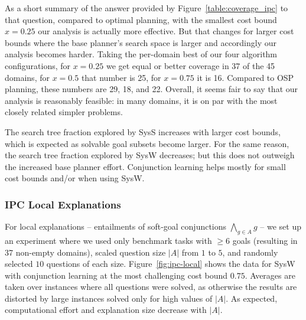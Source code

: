 As a short summary of the answer provided by
Figure~\ref{table:coverage_ipc} to that question, compared to optimal
planning, with the smallest cost bound $x=0.25$ our analysis is
actually more effective. But that changes for larger cost bounds where
the base planner's search space is larger and accordingly our analysis
becomes harder. Taking the per-domain best of our four algorithm
configurations, for $x=0.25$ we get equal or better coverage in 37 of
the 45 domains, for $x=0.5$ that number is 25, for $x=0.75$ it is
16. Compared to OSP planning, these numbers are 29, 18, and
22. Overall, it seems fair to say that our analysis is reasonably
feasible: in many domains, it is on par with the most closely related
simpler problems.

The search tree fraction explored by SysS increases with larger cost
bounds, which is expected as solvable goal subsets become larger. For
the same reason, the search tree fraction explored by SysW decreases;
but this does not outweigh the increased base planner
effort. Conjunction learning helps mostly for small cost bounds and/or
when using SysW.
%
%



\subsubsection{IPC Local Explanations}

For local explanations -- entailments of soft-goal conjunctions
$\bigwedge_{g \in A} g$ -- we set up an experiment where we used only
benchmark tasks with $\geq 6$ goals (resulting in 37 non-empty
domains), scaled question size $|A|$ from $1$ to $5$, and randomly
selected $10$ questions of each size. Figure~\ref{fig:ipc-local} shows
the data for SysW with conjunction learning at the most
challenging cost bound $0.75$.
%
Averages are taken over instances where all questions were solved, as
otherwise the results are distorted by large instances solved only for
high values of $|A|$.
%
As expected, computational effort and explanation size decrease with
$|A|$.

